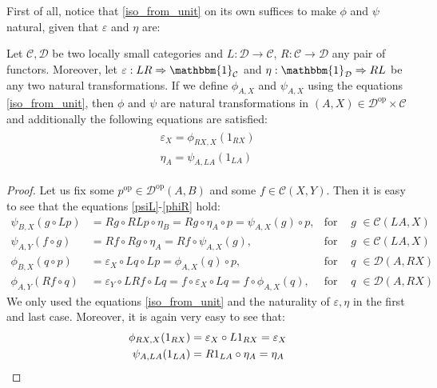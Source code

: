 First of all, notice that \eqref{iso_from_unit} on its own suffices to make $\phi$ and $\psi$ natural, given that $\varepsilon$ and $\eta$ are:
\begin{proposition}\label{prop:nat_gives_nat} Let $\mathcal{C},\mathcal{D}$ be two locally small categories and $L:\mathcal{D}\to\mathcal{C}$, $R:\mathcal{C}\to\mathcal{D}$ any pair of functors. Moreover, let $\varepsilon:LR\Rightarrow\mathbbm{1}_{\mathcal{C}}$ and $\eta:\mathbbm{1}_{\mathcal{D}}\Rightarrow RL$ be any two natural transformations. If we define $\phi_{A,X}$ and $\psi_{A,X}$ using the equations \eqref{iso_from_unit}, then $\phi$ and $\psi$ are natural transformations in $(A,X)\in\mathcal{D}^{\mathrm{op}}\times\mathcal{C}$ and additionally the following equations are satisfied:
\begin{align}
\begin{split}
\varepsilon_X=\phi_{RX,X}(1_{RX})\\[0.8em]
\eta_A=\psi_{A,LA}(1_{LA})
\end{split}\label{unit_from_iso}
\end{align}
\end{proposition}
\begin{proof} Let us fix some $p^{\mathrm{op}}\in\mathcal{D}^{\mathrm{op}}(A,B)$ and some $f\in\mathcal{C}(X,Y)$. Then it is easy to see that the equations \eqref{psiL}-\eqref{phiR} hold:
\begin{align*}
\psi_{B,X}(g\circ Lp)&=Rg\circ RLp\circ\eta_B=Rg\circ\eta_A\circ p=\psi_{A,X}(g)\circ p,&\text{for any } g&\in\mathcal{C}(LA,X)\\
\psi_{A,Y}(f\circ g)&=Rf\circ Rg\circ\eta_A=Rf\circ\psi_{A,X}(g),&\text{for any } g&\in\mathcal{C}(LA,X)\\
\phi_{B,X}(q\circ p)&=\varepsilon_X\circ Lq\circ Lp=\phi_{A,X}(q)\circ p,&\text{for any }q&\in\mathcal{D}(A,RX)\\
\phi_{A,Y}(Rf\circ q)&=\varepsilon_Y\circ LRf\circ Lq=f\circ\varepsilon_X\circ Lq=f\circ\phi_{A,X}(q),&\text{for any }q&\in\mathcal{D}(A,RX)
\end{align*}
We only used the equations \eqref{iso_from_unit} and the naturality of $\varepsilon,\eta$ in the first and last case. Moreover, it is again very easy to see that:
\begin{align*}
\phi_{RX,X}(1_{RX})&=\varepsilon_X\circ L1_{RX}=\varepsilon_X\\
\psi_{A,LA}(1_{LA})&=R1_{LA}\circ\eta_A=\eta_A\qedhere
\end{align*}
\end{proof}

